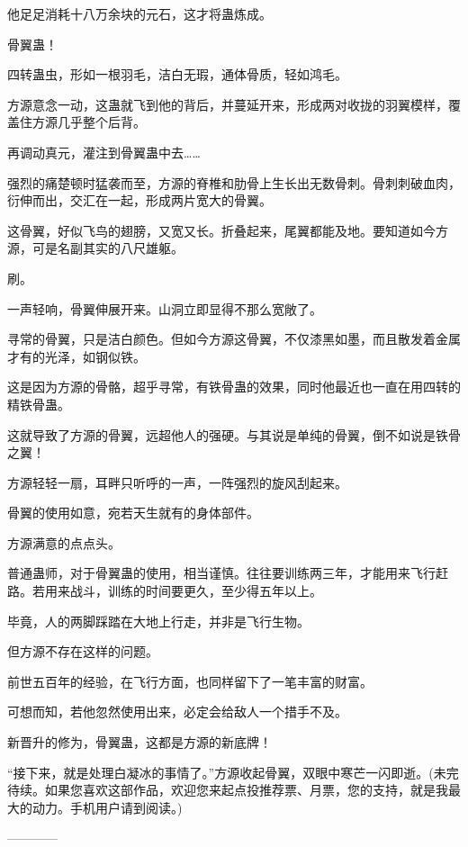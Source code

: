 \begin{this_body}
他足足消耗十八万余块的元石，这才将蛊炼成。

骨翼蛊！

四转蛊虫，形如一根羽毛，洁白无瑕，通体骨质，轻如鸿毛。

方源意念一动，这蛊就飞到他的背后，并蔓延开来，形成两对收拢的羽翼模样，覆盖住方源几乎整个后背。

再调动真元，灌注到骨翼蛊中去……

强烈的痛楚顿时猛袭而至，方源的脊椎和肋骨上生长出无数骨刺。骨刺刺破血肉，衍伸而出，交汇在一起，形成两片宽大的骨翼。

这骨翼，好似飞鸟的翅膀，又宽又长。折叠起来，尾翼都能及地。要知道如今方源，可是名副其实的八尺雄躯。

刷。

一声轻响，骨翼伸展开来。山洞立即显得不那么宽敞了。

寻常的骨翼，只是洁白颜色。但如今方源这骨翼，不仅漆黑如墨，而且散发着金属才有的光泽，如钢似铁。

这是因为方源的骨骼，超乎寻常，有铁骨蛊的效果，同时他最近也一直在用四转的精铁骨蛊。

这就导致了方源的骨翼，远超他人的强硬。与其说是单纯的骨翼，倒不如说是铁骨之翼！

方源轻轻一扇，耳畔只听呼的一声，一阵强烈的旋风刮起来。

骨翼的使用如意，宛若天生就有的身体部件。

方源满意的点点头。

普通蛊师，对于骨翼蛊的使用，相当谨慎。往往要训练两三年，才能用来飞行赶路。若用来战斗，训练的时间要更久，至少得五年以上。

毕竟，人的两脚踩踏在大地上行走，并非是飞行生物。

但方源不存在这样的问题。

前世五百年的经验，在飞行方面，也同样留下了一笔丰富的财富。

可想而知，若他忽然使用出来，必定会给敌人一个措手不及。

新晋升的修为，骨翼蛊，这都是方源的新底牌！

“接下来，就是处理白凝冰的事情了。”方源收起骨翼，双眼中寒芒一闪即逝。(未完待续。如果您喜欢这部作品，欢迎您来起点投推荐票、月票，您的支持，就是我最大的动力。手机用户请到阅读。)

------------

\end{this_body}

